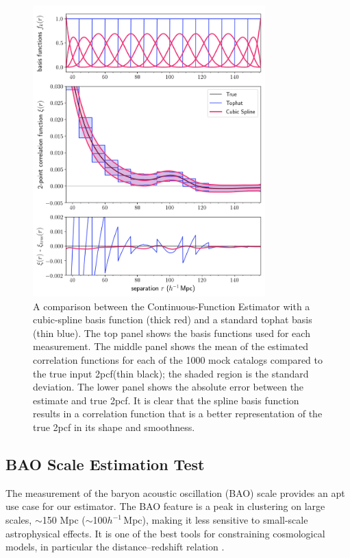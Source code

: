 \documentclass[modern]{aastex62}
\newcommand{\cf}{2pcf\xspace}
\newcommand{\est}{the Continuous-Function Estimator\xspace}
\newcommand{\hmpc}{$h^{-1}\,$Mpc}
\begin{document}
\begin{figure}[ht]
    \centering
        \includegraphics[width=0.8\textwidth]{xicomparison_2e-4_tophat8_spline}
        \caption{A comparison between \est with a cubic-spline basis function (thick red) and a standard tophat basis (thin blue). The top panel shows the basis functions used for each measurement. The middle panel shows the mean of the estimated correlation functions for each of the 1000 mock catalogs compared to the true input \cf (thin black); the shaded region is the standard deviation. The lower panel shows the absolute error between the estimate and true \cf. It is clear that the spline basis function results in a correlation function that is a better representation of the true \cf in its shape and smoothness.}
        \label{fig:spline}
    \end{figure}    

\subsection{BAO Scale Estimation Test}
\label{sec:bao}

The measurement of the baryon acoustic oscillation (BAO) scale provides an apt use case for our estimator.
The BAO feature is a peak in clustering on large scales, $\sim$150 Mpc ($\sim$100\hmpc), making it less sensitive to small-scale astrophysical effects.
It is one of the best tools for constraining cosmological models, in particular the distance--redshift relation \citep{Cole2005, Eisenstein2005, Kazin2010, Anderson2012, Anderson2014, Alam2016}.
\end{document}
